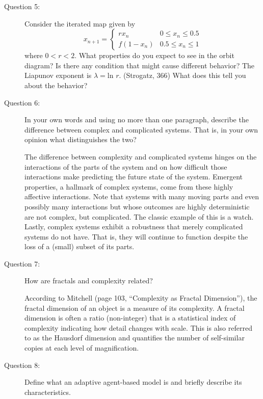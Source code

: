 \documentclass[letterpaper,10pt]{article}
\begin{document}
\begin{description}

\item[Question 5:]
Consider the iterated map given by
\[x_{n+1} = \left\{
  \begin{array}{lr}
    rx_n &  0\le x_n \le 0.5 \\
    f(1-x_n) &  0.5\le x_n \le 1
  \end{array}
\right.
\]
where $0<r<2$.  What properties do you expect to see in the orbit diagram?  Is there any condition that might cause different behavior?  The Liapunov exponent is $\lambda=\mbox{ln\ }r$. (Strogatz, 366)  What does this tell you about the behavior?


\item[Question 6:]
  In your own words and using no more than one paragraph, describe the difference between complex and complicated systems.  That is, in your own opinion what distinguishes the two?

  The difference between complexity and complicated systems hinges on the interactions of the parts of the system and on how difficult those interactions make predicting the future state of the system.  Emergent properties, a hallmark of complex systems, come from these highly affective interactions.  Note that systems with many moving parts and even possibly many interactions but whose outcomes are highly deterministic are not complex, but complicated.  The classic example of
  this is a watch.  Lastly, complex systems exhibit a robustness that merely complicated systems do not have.  That is, they will continue to function despite the loss of a (small) subset of its parts.

\item[Question 7:]
How are fractals and complexity related?

According to Mitchell (page 103, ``Complexity as Fractal Dimension''), the fractal dimension of an object is a measure of its complexity.  A fractal dimension is often a ratio (non-integer) that is a statistical index of complexity indicating how detail changes with scale.  This is also referred to as the Hausdorf dimension and quantifies the number of self-similar copies at each level of magnification.

\item[Question 8:]
Define what an adaptive agent-based model is and briefly describe its characteristics.


\end{description}
\end{document}
